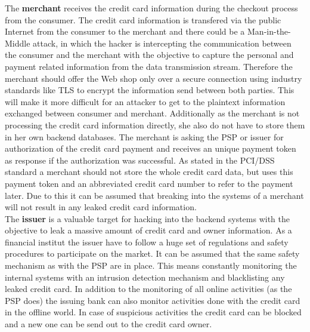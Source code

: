 The \textbf{merchant} receives the credit card information during the checkout process from the consumer. The credit card information is transfered via the public Internet from the consumer to the merchant and there could be a Man-in-the-Middle attack, in which the hacker is intercepting the communication between the consumer and the merchant with the objective to capture the personal and payment related information from the data transmission stream. Therefore the merchant should offer the Web shop only over a secure connection using industry standards like TLS to encrypt the information send between both parties. This will make it more difficult for an attacker to get to the plaintext information exchanged between consumer and merchant. Additionally as the merchant is not processing the credit card information directly, she also do not have to store them in her own backend databases. The merchant is asking the \gls{PSP} or issuer for authorization of the credit card payment and receives an unique payment token as response if the authorization was successful. As stated in the PCI/DSS standard a merchant should not store the whole credit card data, but uses this payment token and an abbreviated credit card number to refer to the payment later. Due to this it can be assumed that breaking into the systems of a merchant will not result in any leaked credit card information. \\

The \textbf{issuer} is a valuable target for hacking into the backend systems with the objective to leak a massive amount of credit card and owner information. As a financial institut the issuer have to follow a huge set of regulations and safety procedures to participate on the market. It can be assumed that the same safety mechanism as with the \gls{PSP} are in place. This means constantly monitoring the internal systems with an intrusion detection mechanism and blacklisting any leaked credit card. In addition to the monitoring of all online activities (as the \gls{PSP} does) the issuing bank can also monitor activities done with the credit card in the offline world. In case of suspicious activities the credit card can be blocked and a new one can be send out to the credit card owner. \\

